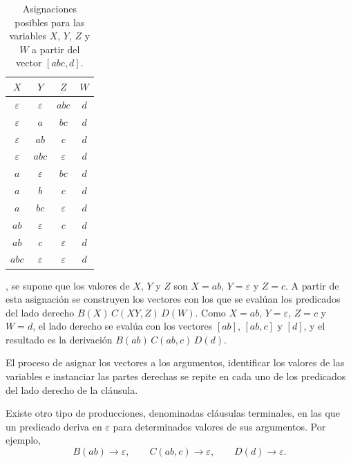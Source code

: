 \documentclass{report}
\theoremstyle{definition}
\theoremstyle{plain}
\theoremstyle{remark}
\begin{document}
\begin{table}[ht]
  \centering
  \begin{tabular}{|c|c|c|c|}
    \hline
    $X$           & $Y$           & $Z$           & $W$ \\ \hline
    $\varepsilon$ & $\varepsilon$ & $abc$         & $d$ \\ \hline
    $\varepsilon$ & $a$           & $bc$          & $d$ \\ \hline
    $\varepsilon$ & $ab$          & $c$           & $d$ \\ \hline
    $\varepsilon$ & $abc$         & $\varepsilon$ & $d$ \\ \hline
    $a$           & $\varepsilon$ & $bc$          & $d$ \\ \hline
    $a$           & $b$           & $c$           & $d$ \\ \hline
    $a$           & $bc$          & $\varepsilon$ & $d$ \\ \hline
    $ab$          & $\varepsilon$ & $c$           & $d$ \\ \hline
    $ab$          & $c$           & $\varepsilon$ & $d$ \\ \hline
    $abc$         & $\varepsilon$ & $\varepsilon$ & $d$ \\ \hline
  \end{tabular}
  \caption{Asignaciones posibles para las variables $X$, $Y$, $Z$ y
    $W$ a partir del vector $[abc, d]$.}
  \label{tab:valores-xyzw}
\end{table}

, se supone que los valores de $X$, $Y$ y
$Z$ son $X = ab$, $Y = \varepsilon$ y $Z = c$. A partir de esta
asignación se construyen los vectores con los que se evalúan los
predicados del lado derecho $B(X)\, C(XY, Z)\, D(W)$. Como $X = ab$,
$Y = \varepsilon$, $Z = c$ y $W = d$, el lado derecho se evalúa con los
vectores $[ab]$, $[ab, c]$ y $[d]$, y el resultado es la derivación
$B(ab)\, C(ab, c)\, D(d)$.

El proceso de asignar los vectores a los argumentos, identificar los
valores de las variables e instanciar las partes derechas se repite en
cada uno de los predicados del lado derecho de la cláusula.

Existe otro tipo de producciones, denominadas cláusulas terminales, en
las que un predicado deriva en $\varepsilon$ para determinados valores
de sus argumentos. Por ejemplo,
\[
  B(ab) \to \varepsilon, \qquad
  C(ab, c) \to \varepsilon, \qquad
  D(d) \to \varepsilon.
\]
\end{document}
